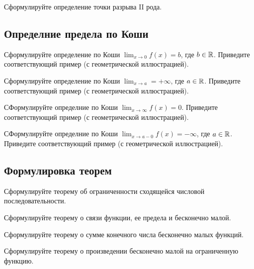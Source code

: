 \begin{question}
  Сформулируйте определение точки разрыва II рода.
\end{question}


\subsection{Определние предела по Коши}

\begin{question}
  Сформулируйте определение по Коши $\lim_{x \to 0} f(x) = b$, где $b \in \mathbb{R}$.
Приведите соответствующий пример (с геометрической иллюстрацией).
\end{question}

\begin{question}
  Сформулируйте определение по Коши $\lim_{x \to a} = +\infty$, где $a \in \mathbb{R}$.
Приведите соответствующий пример (с геометрической иллюстрацией).
\end{question}

\begin{question}
  СФормулируйте определние по Коши $\lim_{x \to \infty} f(x) = 0$.
Приведите соответствующий пример (с геометрической иллюстрацией).
\end{question}
  
\begin{question}
  СФормулируйте определние по Коши $\lim_{x \to a-0} f(x) = -\infty$, где $a \in \mathbb{R}$.
Приведите соответствующий пример (с геометрической иллюстрацией).
\end{question}

\subsection{Формулировка теорем}

\begin{question}
  Сформулируйте теорему об ограниченности сходящейся числовой последовательности.
\end{question}

\begin{question}
  Сформулируйте теорему о связи функции, ее предела и бесконечно малой.  
\end{question}

\begin{question}
  Сформулируйте теорему о сумме конечного числа бесконечно малых функций.
\end{question}

\begin{question}
  Сформулируйте теорему о произведении бесконечно малой на ограниченную функцию.
\end{question}

